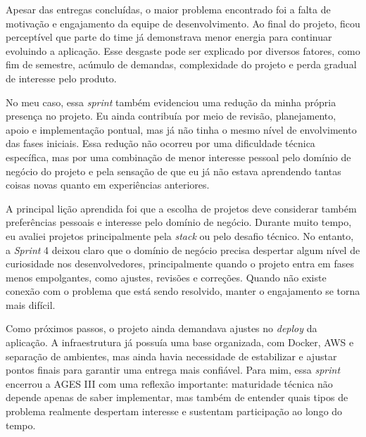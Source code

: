 Apesar das entregas concluídas, o maior problema encontrado foi a falta de motivação e engajamento da equipe de desenvolvimento. Ao final do projeto, ficou perceptível que parte do time já demonstrava menor energia para continuar evoluindo a aplicação. Esse desgaste pode ser explicado por diversos fatores, como fim de semestre, acúmulo de demandas, complexidade do projeto e perda gradual de interesse pelo produto.

No meu caso, essa \textit{sprint} também evidenciou uma redução da minha própria presença no projeto. Eu ainda contribuía por meio de revisão, planejamento, apoio e implementação pontual, mas já não tinha o mesmo nível de envolvimento das fases iniciais. Essa redução não ocorreu por uma dificuldade técnica específica, mas por uma combinação de menor interesse pessoal pelo domínio de negócio do projeto e pela sensação de que eu já não estava aprendendo tantas coisas novas quanto em experiências anteriores.

A principal lição aprendida foi que a escolha de projetos deve considerar também preferências pessoais e interesse pelo domínio de negócio. Durante muito tempo, eu avaliei projetos principalmente pela \textit{stack} ou pelo desafio técnico. No entanto, a \textit{Sprint} 4 deixou claro que o domínio de negócio precisa despertar algum nível de curiosidade nos desenvolvedores, principalmente quando o projeto entra em fases menos empolgantes, como ajustes, revisões e correções. Quando não existe conexão com o problema que está sendo resolvido, manter o engajamento se torna mais difícil.

Como próximos passos, o projeto ainda demandava ajustes no \textit{deploy} da aplicação. A infraestrutura já possuía uma base organizada, com Docker, \ac{AWS} e separação de ambientes, mas ainda havia necessidade de estabilizar e ajustar pontos finais para garantir uma entrega mais confiável. Para mim, essa \textit{sprint} encerrou a \ac{AGES} III com uma reflexão importante: maturidade técnica não depende apenas de saber implementar, mas também de entender quais tipos de problema realmente despertam interesse e sustentam participação ao longo do tempo.
